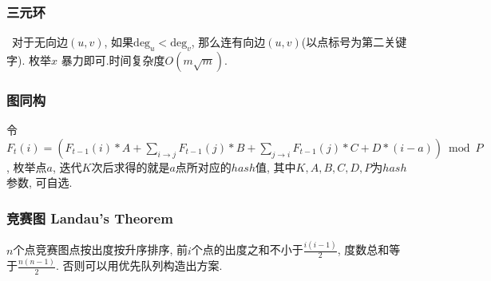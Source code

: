 \begin{comment}
	\paragraph{二物流}
	水源S1, 水汇T1, 油源S2, 油汇T2, 每根管道流量共用. 求流量和最大.
	建超级源SS1汇TT1, 连边SS1$\to$S1,SS1$\to$S2,T1$\to$TT1,T2$\to$TT1, 设最大流为x1.
	建超级源SS2汇TT2, 连边SS2$\to$S1,SS2$\to$T2,T1$\to$TT2,S2$\to$TT2, 设最大流为x2.
	则最大流中水流量$\frac{x1+x2}{2}$, 油流量$\frac{x1-x2}{2}$.
\end{comment}
\begin{comment}
\subsubsection{割点于割边}
        \paragraph{割点 割边} 一个点$u$是割点, 当且仅当: 1. $u$为非树根且有树边$(u,v)$满足$dfn_u\leq low_v$; 2. u为树根且有多于一个的子树. 一条无向边$(u,v)$是桥, 当且仅当$(u,v)$是树边, 且满足$dfn_u<low_v$. 

\subsubsection{2-SAT}
    如果选$A$就必须选$B$就从$A$向$B$连一条边, 如果两个只能选一个的条件在同一个强连通分量中就不合法. 输出可行方案可以比较$X$和$X’$的$bl$的大小, 大的选$X’$. 建图优化一般考虑前后缀的合并. 
\end{comment}
\subsubsection{三元环}\
               对于无向边$(u,v)$, 如果$\mathrm{deg}_u<\mathrm{deg}_v$, 那么连有向边$(u,v)$(以点标号为第二关键字). 枚举$x$ 暴力即可.时间复杂度$O(m\sqrt{m})$. 
\subsubsection{图同构}
                令$F_t(i)=(F_{t-1}(i)*A+\sum_{i\to j} F_{t-1}(j)*B+\sum_{j\to i} F_{t-1}(j)*C+D*(i-a)) \bmod P$, 枚举点$a$, 迭代$K$次后求得的就是$a$点所对应的$hash$值, 其中$K,A,B,C,D,P$为$hash$参数, 可自选. 

\subsubsection{竞赛图 Landau’s Theorem}
    $n$个点竞赛图点按出度按升序排序, 前$i$个点的出度之和不小于$\frac{i(i-1)}{2}$, 度数总和等于$\frac{n(n-1)}{2}$. 否则可以用优先队列构造出方案.

